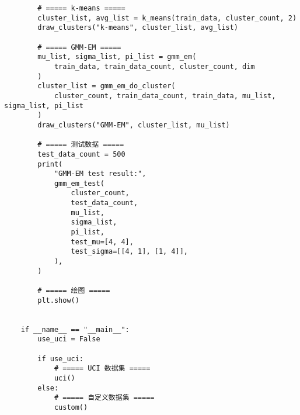 \begin{verbatim}
        # ===== k-means =====
        cluster_list, avg_list = k_means(train_data, cluster_count, 2)
        draw_clusters("k-means", cluster_list, avg_list)

        # ===== GMM-EM =====
        mu_list, sigma_list, pi_list = gmm_em(
            train_data, train_data_count, cluster_count, dim
        )
        cluster_list = gmm_em_do_cluster(
            cluster_count, train_data_count, train_data, mu_list, sigma_list, pi_list
        )
        draw_clusters("GMM-EM", cluster_list, mu_list)

        # ===== 测试数据 =====
        test_data_count = 500
        print(
            "GMM-EM test result:",
            gmm_em_test(
                cluster_count,
                test_data_count,
                mu_list,
                sigma_list,
                pi_list,
                test_mu=[4, 4],
                test_sigma=[[4, 1], [1, 4]],
            ),
        )

        # ===== 绘图 =====
        plt.show()


    if __name__ == "__main__":
        use_uci = False

        if use_uci:
            # ===== UCI 数据集 =====
            uci()
        else:
            # ===== 自定义数据集 =====
            custom()

\end{verbatim}
